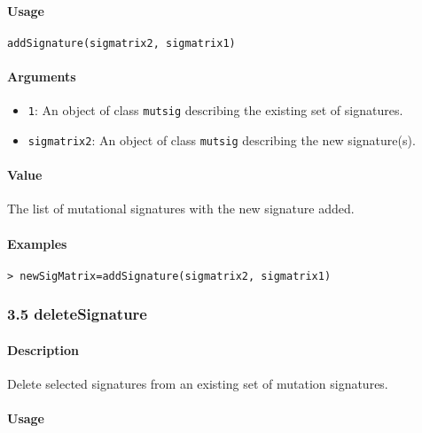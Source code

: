 \documentclass[]{article}
\providecommand{\tightlist}{%
  \setlength{\itemsep}{0pt}\setlength{\parskip}{0pt}}
\let\oldparagraph\paragraph
\renewcommand{\paragraph}[1]{\oldparagraph{#1}\mbox{}}
\begin{document}
\paragraph{\texorpdfstring{\textbf{Usage}}{Usage}}\label{usage-3}

\texttt{addSignature(sigmatrix2,\ sigmatrix1)}

\paragraph{\texorpdfstring{\textbf{Arguments
}}{Arguments }}\label{mutsig}

\begin{itemize}
\tightlist
\item
  \texttt{1}: An object of class \texttt{mutsig} describing the
  existing set of signatures.
\item
  \texttt{sigmatrix2}: An object of class \texttt{mutsig} describing the
  new signature(s).
\end{itemize}

\paragraph{\texorpdfstring{\textbf{Value}}{Value}}\label{value-1}

The list of mutational signatures with the new signature added.

\paragraph{\texorpdfstring{\textbf{Examples}}{Examples}}\label{examples-3}

\begin{verbatim}
> newSigMatrix=addSignature(sigmatrix2, sigmatrix1)
\end{verbatim}

\subsubsection{3.5 deleteSignature}\label{deletesignature}

\paragraph{\texorpdfstring{\textbf{Description}}{Description}}\label{description-4}

Delete selected signatures from an existing set of mutation signatures.

\paragraph{\texorpdfstring{\textbf{Usage}}{Usage}}\label{usage-4}
\end{document}
